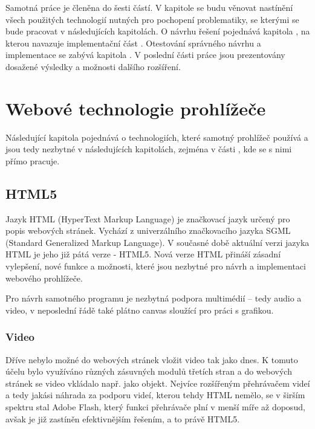 Samotná práce je členěna do šesti částí. V kapitole  se budu věnovat nastínění všech použitých technologií nutných pro pochopení problematiky, se kterými se bude pracovat v následujících kapitolách. O návrhu řešení pojednává kapitola , na kterou navazuje implementační část . Otestování správného návrhu a implementace se zabývá kapitola  . V poslední části práce  jsou prezentovány dosažené výsledky a možnosti dalšího rozšíření.




\chapter{Webové technologie prohlížeče}
\label{chapter:2}
Následující kapitola pojednává o technologiích, které samotný prohlížeč používá a jsou tedy nezbytné v následujících kapitolách, zejména v části , kde se s nimi přímo pracuje.


\section{HTML5}

Jazyk HTML (HyperText Markup Language) je značkovací jazyk určený pro popis webových stránek. Vychází z univerzálního značkovacího jazyka SGML (Standard Generalized Markup Language). V současné době aktuální verzi  jazyka HTML je jeho již pátá verze -  HTML5. Nová verze HTML přináší zásadní vylepšení, nové funkce a možnosti, které jsou nezbytné pro návrh a implementaci webového prohlížeče. 

Pro návrh samotného programu je nezbytná podpora multimédií – tedy audio a video, v neposlední řádě také plátno canvas sloužící pro práci s grafikou.



\subsection{Video}
Dříve nebylo možné do webových stránek vložit video tak jako dnes. K tomuto účelu bylo využíváno různých zásuvných modulů třetích stran a do webových stránek se video vkládalo např. jako objekt. Nejvíce rozšířeným přehrávačem videí a tedy jakási náhrada za podporu videí, kterou tehdy HTML nemělo, se v širším spektru stal Adobe Flash, který funkci přehrávače plní v menší míře až doposud, avšak je již zastíněn efektivnějším řešením, a to právě HTML5.

